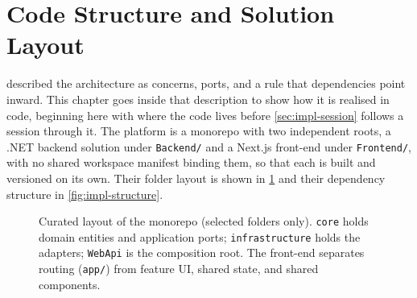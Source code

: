 \section{Code Structure and Solution Layout}
\label{sec:impl-structure}

 described the architecture as concerns, ports, and a rule that dependencies point inward.
This chapter goes inside that description to show how it is realised in code, beginning here with where the code lives before \cref{sec:impl-session} follows a session through it.
The platform is a monorepo with two independent roots, a .NET backend solution under \texttt{Backend/} and a Next.js front-end under \texttt{Frontend/}, with no shared workspace manifest binding them, so that each is built and versioned on its own.
Their folder layout is shown in \cref{fig:impl-tree} and their dependency structure in \cref{fig:impl-structure}.

\begin{figure}[htbp]
\footnotesize
{}
\caption[Curated layout of the monorepo.]{Curated layout of the monorepo (selected folders only). \texttt{core} holds domain entities and application ports; \texttt{infrastructure} holds the adapters; \texttt{WebApi} is the composition root. The front-end separates routing (\texttt{app/}) from feature UI, shared state, and shared components.}
\label{fig:impl-tree}
\end{figure}

